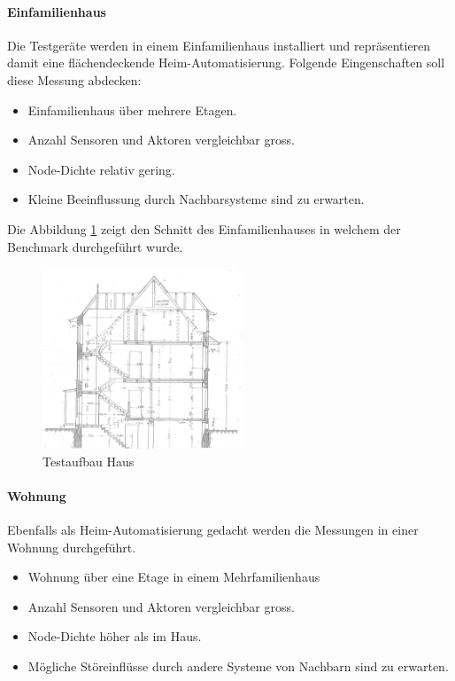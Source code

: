 \paragraph{Einfamilienhaus}
Die Testgeräte werden in einem Einfamilienhaus installiert und repräsentieren damit eine flächendeckende Heim-Automatisierung. Folgende Eingenschaften soll diese Messung abdecken:
\begin{itemize}
	\item Einfamilienhaus über mehrere Etagen.
	\item Anzahl Sensoren und Aktoren vergleichbar gross.
	\item Node-Dichte relativ gering.
	\item Kleine Beeinflussung durch Nachbarsysteme sind zu erwarten.
\end{itemize}

Die Abbildung \ref{fig:TestaufbauHaus} zeigt den Schnitt des Einfamilienhauses in welchem der Benchmark durchgeführt wurde.
\begin{figure}[h]
	\centering
	\includegraphics[width=6cm]{graphics/Testaufbau_Haus_Schnitt.png}
	\caption{Testaufbau Haus}
	\label{fig:TestaufbauHaus}
\end{figure}

\paragraph{Wohnung}
Ebenfalls als Heim-Automatisierung gedacht werden die Messungen in einer Wohnung durchgeführt.
\begin{itemize}
	\item Wohnung über eine Etage in einem Mehrfamilienhaus
	\item Anzahl Sensoren und Aktoren vergleichbar gross.
	\item Node-Dichte höher als im Haus.
	\item Mögliche Störeinflüsse durch andere Systeme von Nachbarn sind zu erwarten.
\end{itemize}

